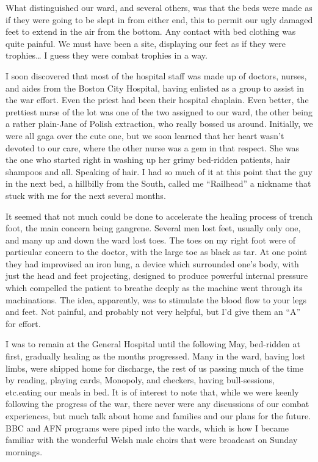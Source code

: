 \documentclass[../m3y]{subfiles}
\begin{document}
What distinguished our ward, and several others, was that the beds were made as if they were going to be slept in from either end, this to permit our ugly damaged feet to extend in the air from the bottom. Any contact with bed clothing was quite painful. We must have been a site, displaying our feet as if they were trophies… I guess they were combat trophies in a way.

I soon discovered that most of the hospital staff was made up of doctors, nurses, and aides from the Boston City Hospital, having enlisted as a group to assist in the war effort. Even the priest had been their hospital chaplain. Even better, the prettiest nurse of the lot was one of the two assigned to our ward, the other being a rather plain-Jane of Polish extraction, who really bossed us around. Initially, we were all gaga over the cute one, but we soon learned that her heart wasn't devoted to our care, where the other nurse was a gem in that respect. She was the one who started right in washing up her grimy bed-ridden patients, hair shampoos and all. Speaking of hair. I had so much of it at this point that the guy in the next bed, a hillbilly from the South, called me ``Railhead'' a nickname that stuck with me for the next several months.

It seemed that not much could be done to accelerate the healing process of trench foot, the main concern being gangrene. Several men lost feet, usually only one, and many up and down the ward lost toes. The toes on my right foot were of particular concern to the doctor, with the large toe as black as tar. At one point they had improvised an iron lung, a device which surrounded one's body, with just the head and feet projecting, designed to produce powerful internal pressure which compelled the patient to breathe deeply as the machine went through its machinations. The idea, apparently, was to stimulate the blood flow to your legs and feet. Not painful, and probably not very helpful, but I'd give them an ``A'' for effort.

I was to remain at the  General Hospital until the following May, bed-ridden at first, gradually healing as the months progressed. Many in the ward, having lost limbs, were shipped home for discharge, the rest of us passing much of the time by reading, playing cards, Monopoly, and checkers, having bull-sessions, etc.\@ eating our meals in bed. It is of interest to note that, while we were keenly following the progress of the war, there never were any discussions of our combat experiences, but much talk about home and families and our plans for the future. BBC and AFN programs were piped into the wards, which is how I became familiar with the wonderful Welsh male choirs that were broadcast on Sunday mornings.
\end{document}

